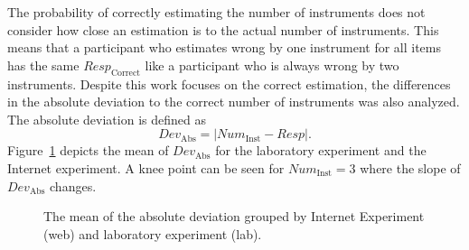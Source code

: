 The probability of correctly estimating the number of instruments does not consider how close an estimation is to the actual number of instruments. This means that a participant who estimates wrong by one instrument for all items has the same $\textit{Resp}_{\mathrm{Correct}}$ like a participant who is always wrong by two instruments. Despite this work focuses on the correct estimation, the differences in the absolute deviation to the correct number of instruments was also analyzed. The absolute deviation is defined as
\begin{equation}
\textit{Dev}_{\mathrm{Abs}} = | \textit{Num}_{\mathrm{Inst}} - \textit{Resp} |
\mathrm{.}
\label{equation:absolute_deviation}
\end{equation}
Figure~\ref{figure:absolute_deviation} depicts the mean of $\textit{Dev}_{\mathrm{Abs}}$ for the laboratory experiment and the Internet experiment. A knee point can be seen for $\textit{Num}_{\mathrm{Inst}} = 3$ where the slope of $\textit{Dev}_{\mathrm{Abs}}$ changes.

\begin{figure}[t]
\centering
\vspace{0.38cm}
\caption{The mean of the absolute deviation grouped by Internet Experiment (web) and laboratory experiment (lab).}
\label{figure:absolute_deviation}
\end{figure}

\makeatletter
{}\tableA
{}\tableB
{}\tableC
{}
\makeatother

